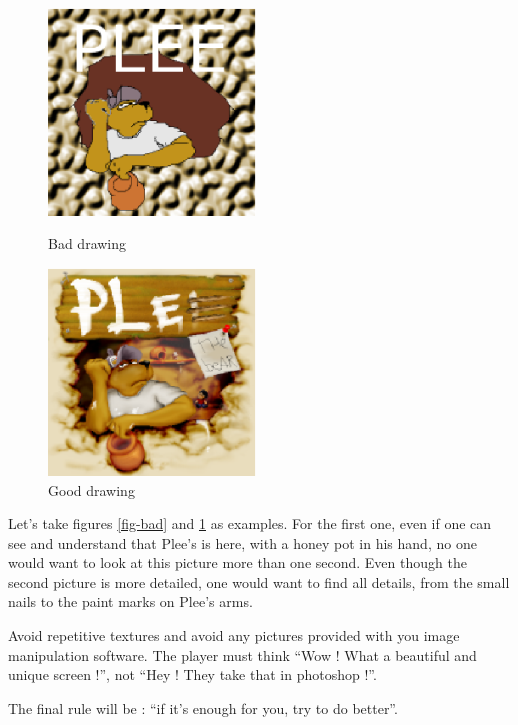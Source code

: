 \documentclass{article}
\begin{document}
\begin{figure}
   \begin{minipage}[c]{.46\linewidth}
     \begin{center}
      \includegraphics[width=5.5cm]{pictures/bad}
      \caption{Bad drawing}
      \label{fig-bad}
     \end{center}
   \end{minipage} \hfill
   \begin{minipage}[c]{.46\linewidth}
     \begin{center}
      \includegraphics[width=5.5cm]{pictures/good}
      \caption{Good drawing}
      \label{fig-good}
     \end{center}
   \end{minipage}
\end{figure}

Let's take figures \ref{fig-bad} and \ref{fig-good} as examples. For
the first one, even if one can see and understand that Plee's is here,
with a honey pot in his hand, no one would want to look at this
picture more than one second. Even though the second picture is more
detailed, one would want to find all details, from the small nails to
the paint marks on Plee's arms.

Avoid repetitive textures and avoid any pictures provided with you
image manipulation software. The player must think ``Wow ! What a
beautiful and unique screen !'', not ``Hey ! They take that in
photoshop !''.

The final rule will be : ``if it's enough for you, try to do better''.
\end{document}
